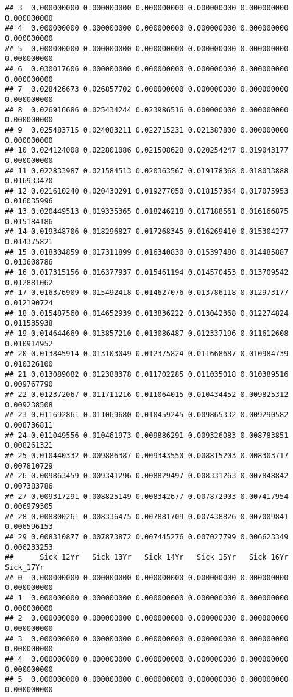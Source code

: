 \documentclass[
]{article}
\begin{document}
\begin{verbatim}
## 3  0.000000000 0.000000000 0.000000000 0.000000000 0.000000000 0.000000000
## 4  0.000000000 0.000000000 0.000000000 0.000000000 0.000000000 0.000000000
## 5  0.000000000 0.000000000 0.000000000 0.000000000 0.000000000 0.000000000
## 6  0.030017606 0.000000000 0.000000000 0.000000000 0.000000000 0.000000000
## 7  0.028426673 0.026857702 0.000000000 0.000000000 0.000000000 0.000000000
## 8  0.026916686 0.025434244 0.023986516 0.000000000 0.000000000 0.000000000
## 9  0.025483715 0.024083211 0.022715231 0.021387800 0.000000000 0.000000000
## 10 0.024124008 0.022801086 0.021508628 0.020254247 0.019043177 0.000000000
## 11 0.022833987 0.021584513 0.020363567 0.019178368 0.018033888 0.016933470
## 12 0.021610240 0.020430291 0.019277050 0.018157364 0.017075953 0.016035996
## 13 0.020449513 0.019335365 0.018246218 0.017188561 0.016166875 0.015184186
## 14 0.019348706 0.018296827 0.017268345 0.016269410 0.015304277 0.014375821
## 15 0.018304859 0.017311899 0.016340830 0.015397480 0.014485887 0.013608786
## 16 0.017315156 0.016377937 0.015461194 0.014570453 0.013709542 0.012881062
## 17 0.016376909 0.015492418 0.014627076 0.013786118 0.012973177 0.012190724
## 18 0.015487560 0.014652939 0.013836222 0.013042368 0.012274824 0.011535938
## 19 0.014644669 0.013857210 0.013086487 0.012337196 0.011612608 0.010914952
## 20 0.013845914 0.013103049 0.012375824 0.011668687 0.010984739 0.010326100
## 21 0.013089082 0.012388378 0.011702285 0.011035018 0.010389516 0.009767790
## 22 0.012372067 0.011711216 0.011064015 0.010434452 0.009825312 0.009238508
## 23 0.011692861 0.011069680 0.010459245 0.009865332 0.009290582 0.008736811
## 24 0.011049556 0.010461973 0.009886291 0.009326083 0.008783851 0.008261321
## 25 0.010440332 0.009886387 0.009343550 0.008815203 0.008303717 0.007810729
## 26 0.009863459 0.009341296 0.008829497 0.008331263 0.007848842 0.007383786
## 27 0.009317291 0.008825149 0.008342677 0.007872903 0.007417954 0.006979305
## 28 0.008800261 0.008336475 0.007881709 0.007438826 0.007009841 0.006596153
## 29 0.008310877 0.007873872 0.007445276 0.007027799 0.006623349 0.006233253
##      Sick_12Yr   Sick_13Yr   Sick_14Yr   Sick_15Yr   Sick_16Yr   Sick_17Yr
## 0  0.000000000 0.000000000 0.000000000 0.000000000 0.000000000 0.000000000
## 1  0.000000000 0.000000000 0.000000000 0.000000000 0.000000000 0.000000000
## 2  0.000000000 0.000000000 0.000000000 0.000000000 0.000000000 0.000000000
## 3  0.000000000 0.000000000 0.000000000 0.000000000 0.000000000 0.000000000
## 4  0.000000000 0.000000000 0.000000000 0.000000000 0.000000000 0.000000000
## 5  0.000000000 0.000000000 0.000000000 0.000000000 0.000000000 0.000000000

\end{verbatim}
\end{document}
